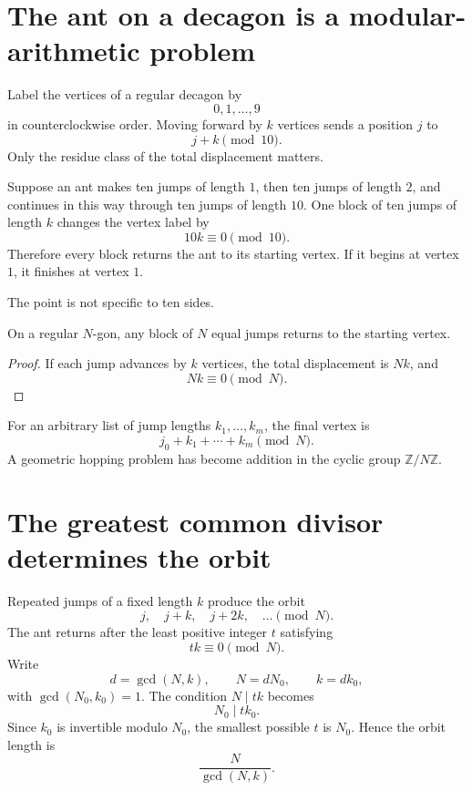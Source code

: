 
\section{The ant on a decagon is a modular-arithmetic problem}

Label the vertices of a regular decagon by
\[
  0,1,\ldots,9
\]
in counterclockwise order.  Moving forward by \(k\) vertices sends a position \(j\) to
\[
  j+k\pmod{10}.
\]
Only the residue class of the total displacement matters.

Suppose an ant makes ten jumps of length \(1\), then ten jumps of length \(2\), and continues in this way through ten jumps of length \(10\).  One block of ten jumps of length \(k\) changes the vertex label by
\[
  10k\equiv0\pmod{10}.
\]
Therefore every block returns the ant to its starting vertex.  If it begins at vertex \(1\), it finishes at vertex \(1\).

The point is not specific to ten sides.

\begin{proposition}
On a regular \(N\)-gon, any block of \(N\) equal jumps returns to the starting vertex.
\end{proposition}

\begin{proof}
If each jump advances by \(k\) vertices, the total displacement is \(Nk\), and
\[
  Nk\equiv0\pmod N.
\]
\end{proof}

For an arbitrary list of jump lengths \(k_1,\ldots,k_m\), the final vertex is
\[
  j_0+k_1+\cdots+k_m\pmod N.
\]
A geometric hopping problem has become addition in the cyclic group \(\mathbb Z/N\mathbb Z\).

\section{The greatest common divisor determines the orbit}

Repeated jumps of a fixed length \(k\) produce the orbit
\[
  j,
  \quad j+k,
  \quad j+2k,
  \quad \ldots
  \pmod N.
\]
The ant returns after the least positive integer \(t\) satisfying
\[
  tk\equiv0\pmod N.
\]
Write
\[
  d=\gcd(N,k),
  \qquad
  N=dN_0,
  \qquad
  k=dk_0,
\]
with \(\gcd(N_0,k_0)=1\).  The condition \(N\mid tk\) becomes
\[
  N_0\mid tk_0.
\]
Since \(k_0\) is invertible modulo \(N_0\), the smallest possible \(t\) is \(N_0\).  Hence the orbit length is
\[
  \boxed{\frac{N}{\gcd(N,k)}.}
\]

